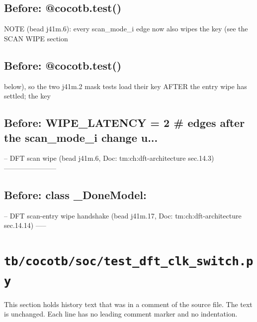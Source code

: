 \begin{record}
\subsection*{Before: @cocotb.test()}

\begin{textblock}
NOTE (bead j41m.6): every scan_mode_i edge now also wipes the key (see the SCAN WIPE section
\end{textblock}

\subsection*{Before: @cocotb.test()}

\begin{textblock}
below), so the two j41m.2 mask tests load their key AFTER the entry wipe has settled; the key
\end{textblock}

\subsection*{Before: WIPE\_LATENCY = 2  \# edges after the scan\_mode\_i change u...}

\begin{textblock}
-- DFT scan wipe (bead j41m.6, Doc: tm:ch:dft-architecture sec.14.3) -----------------------
\end{textblock}

\subsection*{Before: class \_DoneModel:}

\begin{textblock}
-- DFT scan-entry wipe handshake (bead j41m.17, Doc: tm:ch:dft-architecture sec.14.14) -----
\end{textblock}

\end{record}

\section{\texttt{tb/cocotb/soc/test\_dft\_clk\_switch.py}}\label{cr:suite:soc-test-dft-clk-switch}

This section holds history text that was in a comment of the source file. The text is unchanged. Each line has no leading comment marker and no indentation.

